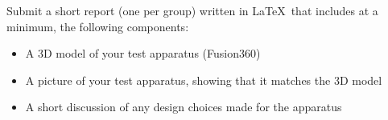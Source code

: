 \documentclass[12pt,letterpaper,onecolumn]{report}
\begin{document}
\noindent Submit a short report (one per group) written in \LaTeX\ that includes at a minimum, the following components:
\begin{itemize}
\item A 3D model of your test apparatus (Fusion360)
\item A picture of your test apparatus, showing that it matches the 3D model
\item A short discussion of any design choices made for the apparatus
\end{itemize}
\end{document}
